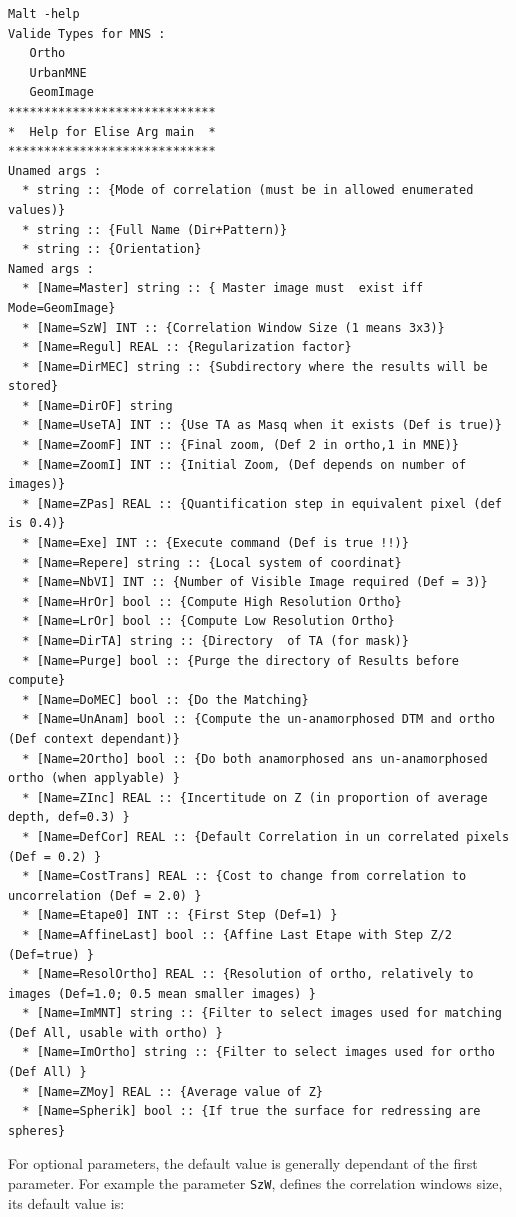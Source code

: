 {\scriptsize
\begin{verbatim}
Malt -help
Valide Types for MNS : 
   Ortho
   UrbanMNE
   GeomImage
*****************************
*  Help for Elise Arg main  *
*****************************
Unamed args : 
  * string :: {Mode of correlation (must be in allowed enumerated values)}
  * string :: {Full Name (Dir+Pattern)}
  * string :: {Orientation}
Named args : 
  * [Name=Master] string :: { Master image must  exist iff Mode=GeomImage}
  * [Name=SzW] INT :: {Correlation Window Size (1 means 3x3)}
  * [Name=Regul] REAL :: {Regularization factor}
  * [Name=DirMEC] string :: {Subdirectory where the results will be stored}
  * [Name=DirOF] string
  * [Name=UseTA] INT :: {Use TA as Masq when it exists (Def is true)}
  * [Name=ZoomF] INT :: {Final zoom, (Def 2 in ortho,1 in MNE)}
  * [Name=ZoomI] INT :: {Initial Zoom, (Def depends on number of images)}
  * [Name=ZPas] REAL :: {Quantification step in equivalent pixel (def is 0.4)}
  * [Name=Exe] INT :: {Execute command (Def is true !!)}
  * [Name=Repere] string :: {Local system of coordinat}
  * [Name=NbVI] INT :: {Number of Visible Image required (Def = 3)}
  * [Name=HrOr] bool :: {Compute High Resolution Ortho}
  * [Name=LrOr] bool :: {Compute Low Resolution Ortho}
  * [Name=DirTA] string :: {Directory  of TA (for mask)}
  * [Name=Purge] bool :: {Purge the directory of Results before compute}
  * [Name=DoMEC] bool :: {Do the Matching}
  * [Name=UnAnam] bool :: {Compute the un-anamorphosed DTM and ortho (Def context dependant)}
  * [Name=2Ortho] bool :: {Do both anamorphosed ans un-anamorphosed ortho (when applyable) }
  * [Name=ZInc] REAL :: {Incertitude on Z (in proportion of average depth, def=0.3) }
  * [Name=DefCor] REAL :: {Default Correlation in un correlated pixels (Def = 0.2) }
  * [Name=CostTrans] REAL :: {Cost to change from correlation to uncorrelation (Def = 2.0) }
  * [Name=Etape0] INT :: {First Step (Def=1) }
  * [Name=AffineLast] bool :: {Affine Last Etape with Step Z/2 (Def=true) }
  * [Name=ResolOrtho] REAL :: {Resolution of ortho, relatively to images (Def=1.0; 0.5 mean smaller images) }
  * [Name=ImMNT] string :: {Filter to select images used for matching (Def All, usable with ortho) }
  * [Name=ImOrtho] string :: {Filter to select images used for ortho (Def All) }
  * [Name=ZMoy] REAL :: {Average value of Z}
  * [Name=Spherik] bool :: {If true the surface for redressing are spheres}
\end{verbatim}
}

For  optional parameters, the default value is generally dependant of the first
parameter. For example the parameter {\tt SzW}, defines the correlation
windows size, its default value is:


